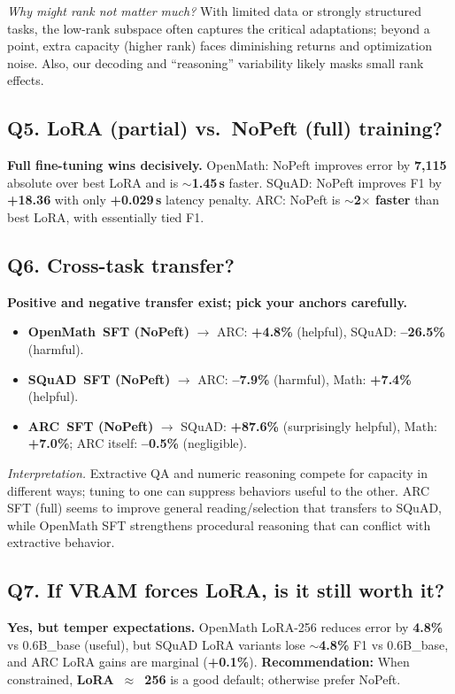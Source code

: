 \documentclass[11pt,a4paper]{article}
\begin{document}
\textit{Why might rank not matter much?} With limited data or strongly structured tasks, the low-rank subspace often captures the critical adaptations; beyond a point, extra capacity (higher rank) faces diminishing returns and optimization noise. Also, our decoding and “reasoning” variability likely masks small rank effects.

\subsection*{\textbf{Q5. LoRA (partial) vs.\ NoPeft (full) training?}}
\textbf{Full fine-tuning wins decisively.} 
OpenMath: NoPeft improves error by \textbf{7{,}115} absolute over best LoRA and is \textbf{$\sim$1.45\,s} faster. 
SQuAD: NoPeft improves F1 by \textbf{+18.36} with only \textbf{+0.029\,s} latency penalty. 
ARC: NoPeft is \textbf{$\sim$2$\times$ faster} than best LoRA, with essentially tied F1.

\subsection*{\textbf{Q6. Cross-task transfer?}}
\textbf{Positive and negative transfer exist; pick your anchors carefully.}
\begin{itemize}
  \item \textbf{OpenMath~SFT (NoPeft)} $\rightarrow$ ARC: \textbf{+4.8\%} (helpful), \; SQuAD: \textbf{--26.5\%} (harmful).
  \item \textbf{SQuAD~SFT (NoPeft)} $\rightarrow$ ARC: \textbf{--7.9\%} (harmful), \; Math: \textbf{+7.4\%} (helpful).
  \item \textbf{ARC~SFT (NoPeft)} $\rightarrow$ SQuAD: \textbf{+87.6\%} (surprisingly helpful), \; Math: \textbf{+7.0\%}; ARC itself: \textbf{--0.5\%} (negligible).
\end{itemize}
\textit{Interpretation.} Extractive QA and numeric reasoning compete for capacity in different ways; tuning to one can suppress behaviors useful to the other. ARC SFT (full) seems to improve general reading/selection that transfers to SQuAD, while OpenMath SFT strengthens procedural reasoning that can conflict with extractive behavior.

\subsection*{\textbf{Q7. If VRAM forces LoRA, is it still worth it?}}
\textbf{Yes, but temper expectations.} 
OpenMath LoRA-256 reduces error by \textbf{4.8\%} vs 0.6B\_base (useful), but SQuAD LoRA variants lose \textbf{$\sim$4.8\%} F1 vs 0.6B\_base, and ARC LoRA gains are marginal (\textbf{+0.1\%}). 
\textbf{Recommendation:} When constrained, \textbf{LoRA~$\approx$~256} is a good default; otherwise prefer NoPeft.
\end{document}
